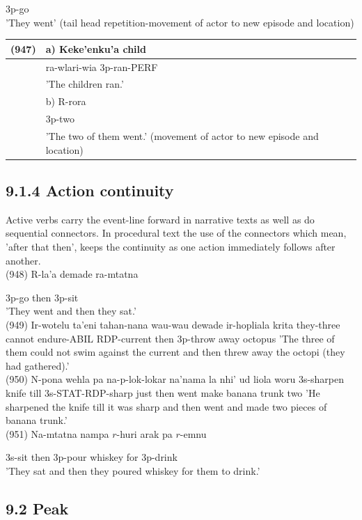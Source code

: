 \documentclass[10pt]{article}
\begin{document}
3p-go\\
'They went' (tail head repetition-movement of actor to new episode and location)

\begin{center}
\begin{tabular}{|l|l|}
\hline
(947) & a) Keke'enku'a child \\
\hline
 & ra-wlari-wia 3p-ran-PERF \\
\hline
 & 'The children ran.' \\
\hline
 & b) R-rora \\
\hline
 & 3p-two \\
\hline
 & 'The two of them went.' (movement of actor to new episode and location) \\
\hline
\end{tabular}
\end{center}

\subsection*{9.1.4 Action continuity}
Active verbs carry the event-line forward in narrative texts as well as do sequential connectors. In procedural text the use of the connectors which mean, 'after that then', keeps the continuity as one action immediately follows after another.\\
(948) R-la'a demade ra-mtatna

3p-go then 3p-sit\\
'They went and then they sat.'\\
(949) Ir-wotelu ta'eni tahan-nana wau-wau dewade ir-hopliala krita they-three cannot endure-ABIL RDP-current then 3p-throw away octopus 'The three of them could not swim against the current and then threw away the octopi (they had gathered).'\\
(950) N-pona wehla pa na-p-lok-lokar na'nama la nhi' ud liola woru 3s-sharpen knife till 3s-STAT-RDP-sharp just then went make banana trunk two 'He sharpened the knife till it was sharp and then went and made two pieces of banana trunk.'\\
(951) Na-mtatna nampa \(r\)-huri arak pa \(r\)-emnu

3s-sit then 3p-pour whiskey for 3p-drink\\
'They sat and then they poured whiskey for them to drink.'

\subsection*{9.2 Peak}
\end{document}
